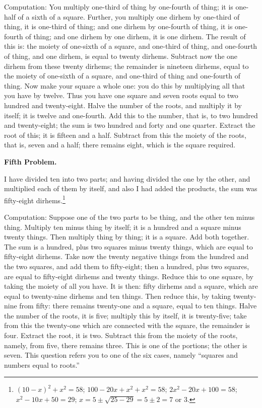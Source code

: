 Computation: You multiply one-third of thing by one-fourth of thing; it is one-half of a sixth of a square. Further, you multiply one dirhem by one-third of thing, it is one-third of thing; and one dirhem by one-fourth of thing, it is one-fourth of thing; and one dirhem by one dirhem, it is one dirhem. The result of this is: the moiety of one-sixth of a square, and one-third of thing, and one-fourth of thing, and one dirhem, is equal to twenty dirhems. Subtract now the one dirhem from these twenty dirhems; the remainder is nineteen dirhems, equal to the moiety of one-sixth of a square, and one-third of thing and one-fourth of thing. Now make your square a whole one: you do this by multiplying all that you have by twelve. Thus you have one square and seven roots equal to two hundred and twenty-eight. Halve the number of the roots, and multiply it by itself; it is twelve and one-fourth. Add this to the number, that is, to two hundred and twenty-eight; the sum is two hundred and forty and one quarter. Extract the root of this; it is fifteen and a half. Subtract from this the moiety of the roots, that is, seven and a half; there remains eight, which is the square required.

\vspace{0.3cm}
\noindent\textbf{Fifth Problem.}

I have divided ten into two parts; and having divided the one by the other, and multiplied each of them by itself, and also I had added the products, the sum was fifty-eight dirhems.\footnote{$(10-x)^2 + x^2 = 58$; $100 - 20x + x^2 + x^2 = 58$; $2x^2 - 20x + 100 = 58$; $x^2 - 10x + 50 = 29$; $x = 5 \pm \sqrt{25-29} = 5 \pm 2 = 7$ or $3$.}

Computation: Suppose one of the two parts to be thing, and the other ten minus thing. Multiply ten minus thing by itself; it is a hundred and a square minus twenty things. Then multiply thing by thing; it is a square. Add both together. The sum is a hundred, plus two squares minus twenty things, which are equal to fifty-eight dirhems. Take now the twenty negative things from the hundred and the two squares, and add them to fifty-eight; then a hundred, plus two squares, are equal to fifty-eight dirhems and twenty things. Reduce this to one square, by taking the moiety of all you have. It is then: fifty dirhems and a square, which are equal to twenty-nine dirhems and ten things. Then reduce this, by taking twenty-nine from fifty: there remains twenty-one and a square, equal to ten things. Halve the number of the roots, it is five; multiply this by itself, it is twenty-five; take from this the twenty-one which are connected with the square, the remainder is four. Extract the root, it is two. Subtract this from the moiety of the roots, namely, from five, there remains three. This is one of the portions; the other is seven. This question refers you to one of the six cases, namely ``squares and numbers equal to roots.''

